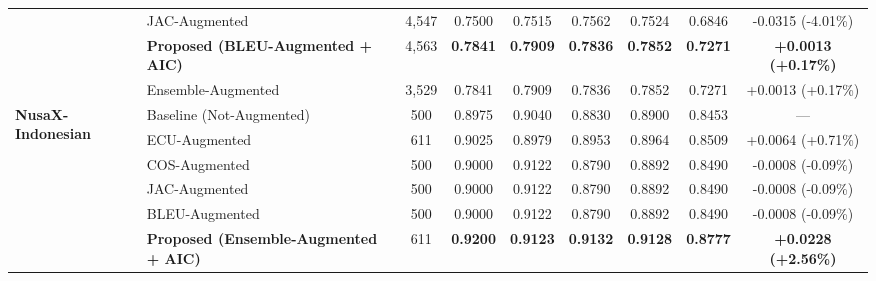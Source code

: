 \begin{tabularx}{\textwidth}{l >{\raggedright\arraybackslash}X c c c c c c c}
& JAC-Augmented & 4,547 & 0.7500 & 0.7515 & 0.7562 & 0.7524 & 0.6846 & -0.0315 (-4.01\%) \\
& \textbf{Proposed (BLEU-Augmented + AIC)} & 4,563 & \textbf{0.7841} & \textbf{0.7909} & \textbf{0.7836} & \textbf{0.7852} & \textbf{0.7271} & \textbf{+0.0013 (+0.17\%)} \\
& Ensemble-Augmented & 3,529 & 0.7841 & 0.7909 & 0.7836 & 0.7852 & 0.7271 & +0.0013 (+0.17\%) \\
\midrule
\multirow{6}{*}{\textbf{NusaX-Indonesian}}
& Baseline (Not-Augmented) & 500 & 0.8975 & 0.9040 & 0.8830 & 0.8900 & 0.8453 & --- \\
& ECU-Augmented & 611 & 0.9025 & 0.8979 & 0.8953 & 0.8964 & 0.8509 & +0.0064 (+0.71\%) \\
& COS-Augmented & 500 & 0.9000 & 0.9122 & 0.8790 & 0.8892 & 0.8490 & -0.0008 (-0.09\%) \\
& JAC-Augmented & 500 & 0.9000 & 0.9122 & 0.8790 & 0.8892 & 0.8490 & -0.0008 (-0.09\%) \\
& BLEU-Augmented & 500 & 0.9000 & 0.9122 & 0.8790 & 0.8892 & 0.8490 & -0.0008 (-0.09\%) \\
& \textbf{Proposed (Ensemble-Augmented + AIC)} & 611 & \textbf{0.9200} & \textbf{0.9123} & \textbf{0.9132} & \textbf{0.9128} & \textbf{0.8777} & \textbf{+0.0228 (+2.56\%)} \\
\bottomrule
\end{tabularx}